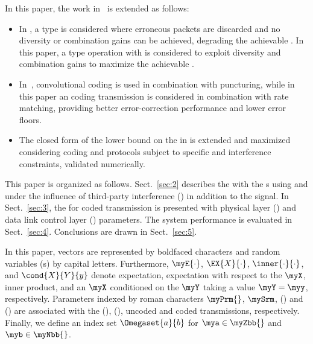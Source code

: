 In this paper, the work in~\cite{Mansour2022_alt} is extended as follows:
\vspace{0.5em}
\begin{itemize}[leftmargin=0.9em]
    \renewcommand\labelitemi{$\scriptstyle\bullet$}
    \item In \cite{Mansour2022_alt}, a \myTHARQ{} type \myI{} is considered where erroneous packets are discarded and no diversity or combination gains can be achieved, degrading the achievable \mySE{}. In this paper, a \myTHARQ{} type \myII{} operation with \myCC{} is considered to exploit diversity and combination gains to maximize the achievable \mySE{}.
    \item In~\cite{Mansour2022_alt}, convolutional coding is used in combination with puncturing, while in this paper an \myLDPC{} coding transmission is considered in combination with rate matching, providing better error-correction performance and lower error floors.
    \item The closed form of the lower bound on the \mySE{} in \cite{Mansour2022_alt} is extended and maximized considering \myLDPC{} coding and \myCC{} protocols subject to specific \myQoS{} and interference constraints, validated numerically.
\end{itemize}
\vspace{0.5em}

This paper is organized as follows. Sect.~\ref{sec:2} describes the \myUCRS{} with the \myDFTFB{}s using \myCLO{} and \myTHARQ{} under the influence of third-party interference (\myTPI{}) in addition to the \myPU{} signal. In Sect.~\ref{sec:3}, the \myCLO{} for coded \mySU{} transmission is presented with physical layer (\myPHY{}) and data link control layer (\myDLC{}) parameters. The \myCLO{} system performance is evaluated in Sect.~\ref{sec:4}. Conclusions are drawn in Sect.~\ref{sec:5}.

In this paper, vectors are represented by boldfaced characters and random variables (\myRV s) by capital letters. Furthermore, $\myE{\cdot}$, $\EX{X}{\cdot}$, $\inner{\cdot}{\cdot}$, and $\cond{X}{Y}{y}$ denote expectation, expectation with respect to the \myRV{} $\myX$, inner product, and an \myRV{} $\myX$ conditioned on the \myRV{} $\myY$ taking a value $\myY = \myy$, respectively. Parameters indexed by roman characters $\myPrm{}$, $\mySrm$, (\myun{}) and (\myco{}) are associated with the (\myPU{}), (\mySU{}), uncoded and coded transmissions, respectively. Finally, we define an index set $\Omegaset{a}{b}$ for $\mya \in \myZbb{}$ and $\myb \in \myNbb{}$.

